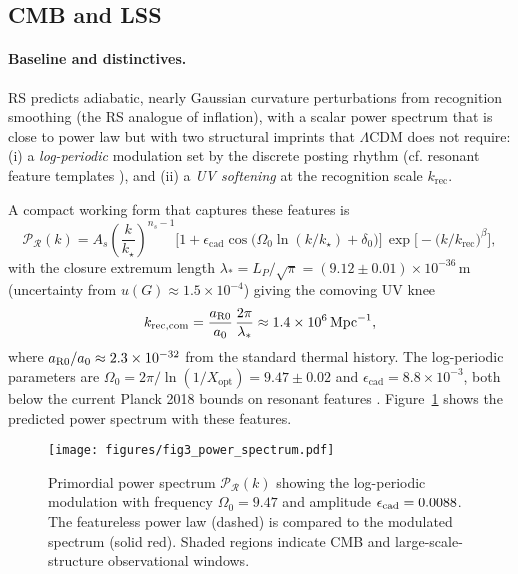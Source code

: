 \documentclass[11pt]{article}
\theoremstyle{definition}
\theoremstyle{remark}
\begin{document}
\subsection{CMB and LSS}

\paragraph{Baseline and distinctives.}
RS predicts adiabatic, nearly Gaussian curvature perturbations from recognition smoothing (the RS analogue of inflation), with a scalar power spectrum that is close to power law but with two structural imprints that \(\Lambda\)CDM does not require:
(i) a \emph{log-periodic} modulation set by the discrete posting rhythm (cf. resonant feature templates \citep{ChenResonant2007}), and
(ii) a \emph{UV softening} at the recognition scale \(k_{\mathrm{rec}}\).

A compact working form that captures these features is
\begin{equation}
\label{eq:Pr_RS}
\mathcal P_{\mathcal R}(k)
= A_s\left(\frac{k}{k_\star}\right)^{n_s-1}
\Big[1+\epsilon_{\mathrm{cad}}\cos\!\big(\Omega_0\ln(k/k_\star)+\delta_0\big)\Big]\,
\exp\!\Big[-\big(k/k_{\mathrm{rec}}\big)^{\beta}\Big],
\end{equation}
with the closure extremum length \(\lambda_{\ast} = L_P/\sqrt{\pi} = (9.12 \pm 0.01)\times10^{-36}\,\mathrm{m}\) (uncertainty from \(u(G) \approx 1.5\times10^{-4}\)) giving the comoving UV knee
\[
k_{\mathrm{rec,com}} = \frac{a_{\rm R0}}{a_0}\,\frac{2\pi}{\lambda_{\ast}} \approx 1.4\times10^{6}\,\mathrm{Mpc}^{-1},
\]
where \(a_{\rm R0}/a_0 \approx 2.3\times10^{-32}\) from the standard thermal history. The log-periodic parameters are \(\Omega_0 = 2\pi/\ln(1/X_{\mathrm{opt}}) = 9.47 \pm 0.02\) and \(\epsilon_{\mathrm{cad}} = 8.8\times10^{-3}\), both below the current Planck 2018 bounds on resonant features \citep{Planck2018resonant}. Figure~\ref{fig:pps} shows the predicted power spectrum with these features.

\begin{figure}[htbp]
\centering
\texttt{[image: figures/fig3\_power\_spectrum.pdf]}
\caption{Primordial power spectrum \(\mathcal{P}_{\mathcal{R}}(k)\) showing the log-periodic modulation with frequency \(\Omega_0 = 9.47\) and amplitude \(\epsilon_{\rm cad} = 0.0088\). The featureless power law (dashed) is compared to the modulated spectrum (solid red). Shaded regions indicate CMB and large-scale-structure observational windows.}
\label{fig:pps}
\end{figure}
\end{document}
